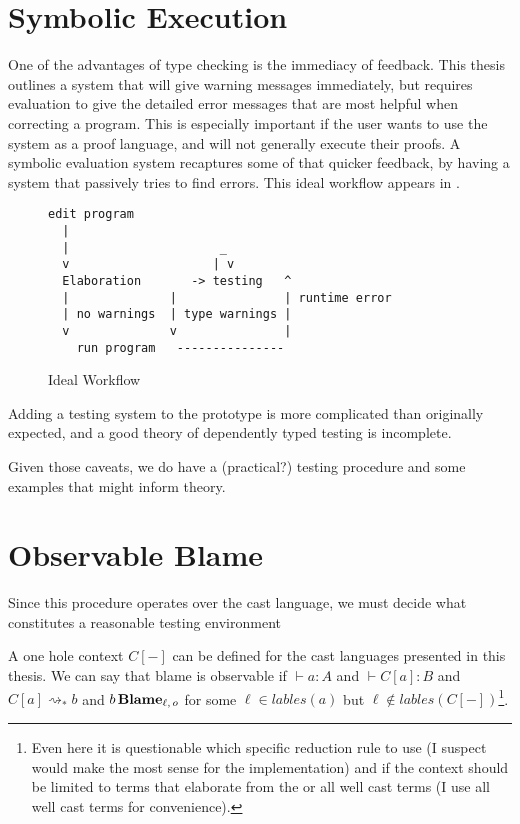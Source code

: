 \section{Symbolic Execution}

One of the advantages of type checking is the immediacy of feedback.
This thesis outlines a system that will give warning messages immediately, but requires evaluation to give the detailed error messages that are most helpful when correcting a program.
This is especially important if the user wants to use the system as a proof language, and will not generally execute their proofs.
A symbolic evaluation system recaptures some of that quicker feedback, by having a system that passively tries to find errors.
This ideal workflow appears in .


\begin{figure}
\begin{lstlisting}
edit program
  |      
  |                     _
  v                    | v
  Elaboration       -> testing   ^
  |              |               | runtime error
  | no warnings  | type warnings |
  v              v               |
    run program   ---------------
\end{lstlisting}


\caption{Ideal Workflow}
\label{fig:notes-workflow}
\end{figure}
 
Adding a testing system to the prototype is more complicated than originally expected, and a good theory of dependently typed testing is incomplete.
 
Given those caveats, we do have a (practical?) testing procedure and some examples that might inform theory.
 
\section{Observable Blame}
Since this procedure operates over the cast language, we must decide what constitutes a reasonable testing environment
 
A one hole context $C[-]$ can be defined for the cast languages presented in this thesis.
We can say that blame is observable if $\vdash a:A$ and $\vdash C[a]:B$ and $C[a]\rightsquigarrow_{*}b$ and $b\,\textbf{Blame}{}_{\ell, \,o}$ for some $\ell \in lables\left(a\right)$ but $\ell \notin lables\left(C[-]\right)$\footnote{
 Even here it is questionable which specific reduction rule to use (I suspect \cbv{} would make the most sense for the implementation) and if the context should be limited to terms that elaborate from the \slang or all well cast terms (I use all well cast terms for convenience).
}.
 
